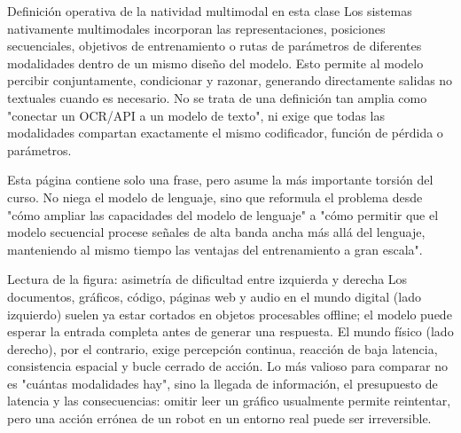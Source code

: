 \begin{importantbox}{Definición operativa de la natividad multimodal en esta clase}
Los sistemas nativamente multimodales incorporan las representaciones, posiciones secuenciales, objetivos de entrenamiento o rutas de parámetros de diferentes modalidades dentro de un mismo diseño del modelo. Esto permite al modelo percibir conjuntamente, condicionar y razonar, generando directamente salidas no textuales cuando es necesario. No se trata de una definición tan amplia como "conectar un OCR/API a un modelo de texto", ni exige que todas las modalidades compartan exactamente el mismo codificador, función de pérdida o parámetros.
\end{importantbox}

Esta página contiene solo una frase, pero asume la más importante torsión del curso. No niega el modelo de lenguaje, sino que reformula el problema desde "cómo ampliar las capacidades del modelo de lenguaje" a "cómo permitir que el modelo secuencial procese señales de alta banda ancha más allá del lenguaje, manteniendo al mismo tiempo las ventajas del entrenamiento a gran escala".


\begin{knowledgebox}{Lectura de la figura: asimetría de dificultad entre izquierda y derecha}
Los documentos, gráficos, código, páginas web y audio en el mundo digital (lado izquierdo) suelen ya estar cortados en objetos procesables offline; el modelo puede esperar la entrada completa antes de generar una respuesta. El mundo físico (lado derecho), por el contrario, exige percepción continua, reacción de baja latencia, consistencia espacial y bucle cerrado de acción. Lo más valioso para comparar no es "cuántas modalidades hay", sino la llegada de información, el presupuesto de latencia y las consecuencias: omitir leer un gráfico usualmente permite reintentar, pero una acción errónea de un robot en un entorno real puede ser irreversible.
\end{knowledgebox}


